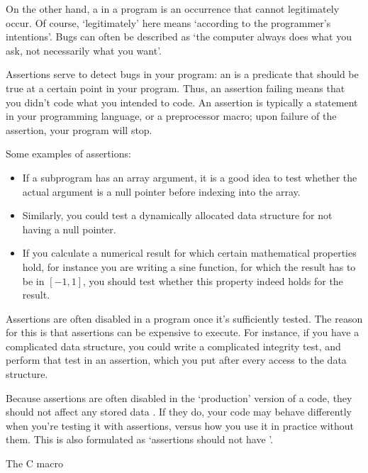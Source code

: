On the other hand, a  in a program is an occurrence that cannot
legitimately occur. Of course, `legitimately' here means `according to
the programmer's intentions'. Bugs can often be described as `the computer
always does what you ask, not necessarily what you want'.

Assertions serve to detect bugs in your program: an 
is a predicate that should be true at a certain point in your program.
Thus, an assertion failing means that you didn't code what you intended to code.
An assertion is typically a statement in your programming language,
or a preprocessor macro; upon failure of the assertion, your program
will stop.

Some examples of assertions:
\begin{itemize}
\item If a subprogram has an array argument, it is a good idea to
  test whether the actual argument is a null pointer before indexing
  into the array.
\item Similarly, you could test a dynamically allocated data structure
  for not having a null pointer.
\item If you calculate a numerical result for which certain
  mathematical properties hold, for instance you are writing a sine function, for
  which the result has to be in $[-1,1]$, you should test whether this
  property indeed holds for the result.
\end{itemize}

Assertions are often disabled in a program once it's sufficiently tested.
The reason for this is that assertions can be expensive to execute.
For instance, 
if you have a complicated data structure, you could write a complicated
integrity test, and perform that test in an assertion, which you put
after every access to the data structure.

Because assertions are often disabled in the `production' version of a code,
they should not affect any stored data . If they do, your code may
behave differently when you're testing it with assertions, versus how you
use it in practice without them. This is also formulated as `assertions
should not have '.


 {The C \protect{} macro}

